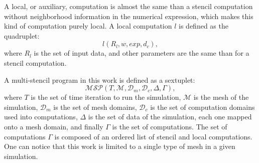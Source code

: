 A local, or auxiliary, computation is almost the same than a stencil computation without neighborhood information in the numerical expression, which makes this kind of computation purely local. A local computation $l$ is defined as the quadruplet:
\begin{equation} 
l(R_l,w,exp,d_c),
\label{eq:loc}
\end{equation}
where $R_l$ is the set of input data, and other parameters are the same than for a stencil computation.

A multi-stencil program in this work is defined as a sextuplet:
\begin{equation} 
\mathcal{MSP}(T,\mathcal{M},\mathcal{D}_m,\mathcal{D}_c,\Delta,\Gamma),
\label{eq:msp}
\end{equation}
where $T$ is the set of time iteration to run the simulation, $\mathcal{M}$ is the mesh of the simulation, $\mathcal{D}_m$ is the set of mesh domains, $\mathcal{D}_c$ is the set of computation domains used into computations, $\Delta$ is the set of data of the simulation, each one mapped onto a mesh domain, and finally $\Gamma$ is the set of computations. The set of computations $\Gamma$ is composed of an ordered list of stencil and local computations. One can notice that this work is limited to a single type of mesh in a given simulation.



